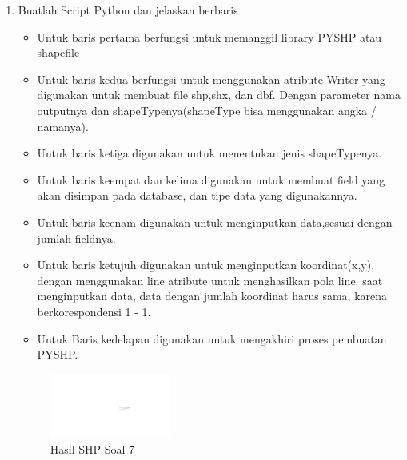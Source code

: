 \begin{enumerate}
	\item Buatlah Script Python dan jelaskan berbaris
	
	\begin{itemize}
		\item Untuk baris pertama berfungsi untuk memanggil library PYSHP atau shapefile
		\item Untuk baris kedua berfungsi untuk menggunakan atribute Writer yang digunakan untuk membuat file shp,shx, dan dbf. \hfill\break Dengan parameter nama outputnya dan shapeTypenya(shapeType bisa menggunakan angka / namanya).
		\item Untuk baris ketiga digunakan untuk menentukan jenis shapeTypenya.
		\item Untuk baris keempat dan kelima digunakan untuk membuat field yang akan disimpan pada database, dan tipe data yang digunakannya.
		\item Untuk baris keenam digunakan untuk menginputkan data,sesuai dengan jumlah fieldnya.
		\item Untuk baris ketujuh digunakan untuk menginputkan koordinat(x,y), dengan menggunakan line atribute untuk menghasilkan pola line. \hfill\break
		saat menginputkan data, data dengan jumlah koordinat harus sama, karena berkorespondensi 1 - 1.
		\item Untuk Baris kedelapan digunakan untuk mengakhiri proses pembuatan PYSHP.
	\end{itemize}
	\hfill\break
	\begin{figure}[H]
		\includegraphics[width=4cm]{figures/1174095/2/7.png}
		\centering
		\caption{Hasil SHP Soal 7}
	\end{figure}


\end{enumerate}
